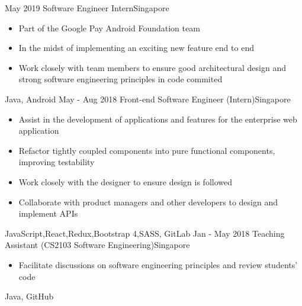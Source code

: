 %
%
%

\begin{experiences}
  \experience
    {May 2019}   {Software Engineer Intern}{}{Singapore}
    {} {
                      \begin{itemize}
                        \item Part of the Google Pay Android Foundation team
                        \item In the midst of implementing an exciting new feature end to end
                        \item Work closely with team members to ensure good architectural design and strong software engineering principles in code commited

                      \end{itemize}
                    }
                    {Java, Android}
  \emptySeparator
  \experience
    {May - Aug 2018}   {Front-end Software Engineer (Intern)}{}{Singapore}
    {} {
                      \begin{itemize}
                        \item Assist in the development of applications and features for the enterprise web application
                        \item Refactor tightly coupled components into pure functional components, improving testability
                        \item Work closely with the designer to ensure design is followed
                        \item Collaborate with product managers and other developers to design and implement APIs
                      \end{itemize}
                    }
                    {JavaScript,React,Redux,Bootstrap 4,SASS, GitLab}
  \emptySeparator
  \experience
    {Jan - May 2018} {Teaching Assistant (CS2103 Software Engineering)}{}{Singapore}
    {}    {
                      \begin{itemize}
                        \item Facilitate discussions on software engineering principles and review students' code
                      \end{itemize}
                    }
                    {Java, GitHub}
\end{experiences}
